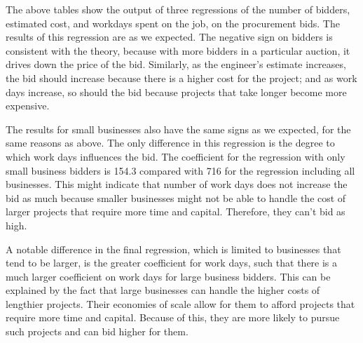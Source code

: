 The above tables show the output of three regressions of the
number of bidders, estimated cost, and workdays spent on the job,
on the procurement bids.
The results of this regression are as we expected. The negative sign on bidders
is consistent with the theory, because with more bidders in a
particular auction, it drives down the price of the bid.
Similarly, as the engineer’s estimate increases, the bid should
increase because there is a higher cost for the project; and as work days
increase, so should the bid because projects that take longer become more expensive.

The results for small businesses also have the same signs as we expected, for
the same reasons as above. The only difference in this regression is the degree
to which work days
influences the bid. The coefficient for the regression with only small business
bidders is 154.3 compared with 716 for the regression including all businesses.
This might indicate that number of work days does not increase the bid as much
because smaller businesses might not be able to handle the cost of larger
projects that require more time and capital. Therefore, they can’t bid as high.

A notable difference in the final regression, which is limited
to businesses that tend to be larger, is the greater coefficient
for work days, such that there is
a much larger coefficient on work days for large business bidders. This can be
explained by the fact that large businesses can handle the higher costs of
lengthier projects. Their economies of scale allow for them to afford projects
that require more time and capital. Because of this, they are more likely
to pursue such projects and can bid higher for them.

